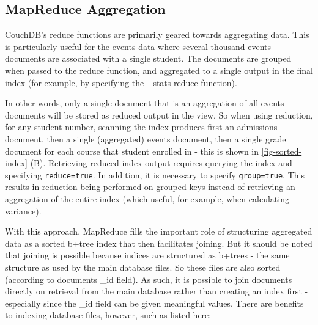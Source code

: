 \subsection{MapReduce Aggregation}
CouchDB's reduce functions are primarily geared towards aggregating data. This is particularly useful for the events data where several thousand events documents are associated with a single student. The documents are grouped when passed to the reduce function, and aggregated to a single output in the final index (for example, by specifying the \_stats reduce function).

In other words, only a single document that is an aggregation of all events documents will be stored as reduced output in the view. So when using reduction, for any student number, scanning the index produces first an admissions document, then a single (aggregated) events document, then a single grade document for each course that student enrolled in - this is shown in \ref{fig-sorted-index} (B). Retrieving reduced index output requires querying the index and specifying \texttt{reduce=true}. In addition, it is necessary to specify \texttt{group=true}. This results in reduction being performed on grouped keys instead of retrieving an aggregation of the entire index (which useful, for example, when calculating variance).



With this approach, MapReduce fills the important role of structuring aggregated data as a sorted b+tree index that then facilitates joining. But it should be noted that joining is possible because indices are structured as b+trees - the same structure as used by the main database files. So these files are also sorted (according to documents \_id field). As such, it is possible to join documents directly on retrieval from the main database rather than creating an index first - especially since the \_id field can be given meaningful values. There are benefits to indexing database files, however, such as listed here:

